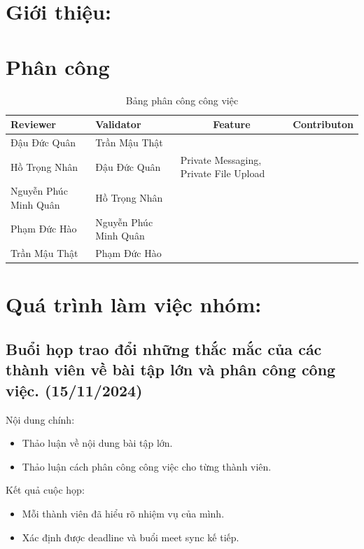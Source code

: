 \documentclass[a4paper, 12pt]{article}
\begin{document}
\newpage
\tableofcontents
\newpage
\section{Giới thiệu:}

\section{Phân công}
 \begin{table}[H]
\centering
\begin{tabular}{|p{3cm}|p{3cm}|l|c|}
\hline 
Reviewer &
Validator &
  \multicolumn{1}{c|}{Feature} &Contributon \\ \hline
Đậu Đức Quân & Trần Mậu Thật &&\\\hline
Hồ Trọng Nhân & Đậu Đức Quân &Private Messaging, Private File Upload&\\ \hline
Nguyễn Phúc Minh Quân & Hồ Trọng Nhân &&\\ \hline
Phạm Đức Hào & Nguyễn Phúc Minh Quân &&\\ \hline
Trần Mậu Thật & Phạm Đức Hào &&\\ \hline
\end{tabular}
\caption{Bảng phân công công việc}
\label{tab:my-table}
\end{table}





\newpage
\section{Quá trình làm việc nhóm:}
\subsection{Buổi họp trao đổi những thắc mắc của các thành viên về bài tập lớn và phân công công việc. (15/11/2024)}
Nội dung chính:
\begin{itemize}
    \item Thảo luận về nội dung bài tập lớn.
    \item Thảo luận cách phân công công việc cho từng thành viên.
\end{itemize}
Kết quả cuộc họp:
\begin{itemize}
  \item Mỗi thành viên đã hiểu rõ nhiệm vụ của mình.
  \item Xác định được deadline và buổi meet sync kế tiếp.
\end{itemize}
\end{document}
